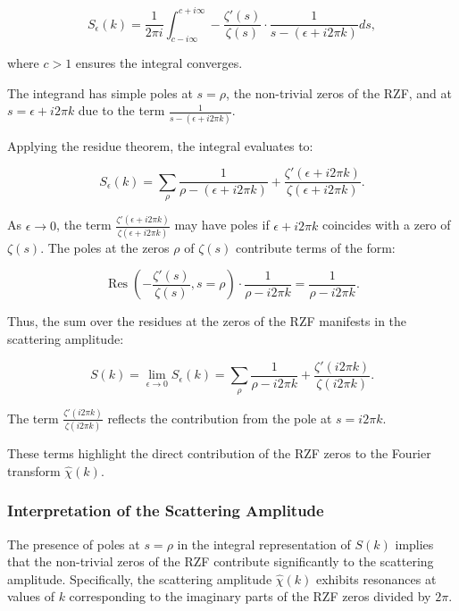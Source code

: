 \documentclass[11pt, oneside]{article}
\begin{document}
\begin{equation}
S_\epsilon(k) = \frac{1}{2\pi i} \int_{c - i \infty}^{c + i \infty} -\frac{\zeta'(s)}{\zeta(s)} \cdot \frac{1}{s - (\epsilon + i 2\pi k)} ds,
\end{equation}

where $c > 1$ ensures the integral converges.

The integrand has simple poles at $s = \rho$, the non-trivial zeros of the RZF, and at $s = \epsilon + i 2\pi k$ due to the term $\frac{1}{s - (\epsilon + i 2\pi k)}$.

Applying the residue theorem, the integral evaluates to:

\begin{equation}
S_\epsilon(k) = \sum_{\rho} \frac{1}{\rho - (\epsilon + i 2\pi k)} + \frac{\zeta'(\epsilon + i 2\pi k)}{\zeta(\epsilon + i 2\pi k)}.
\end{equation}

As $\epsilon \to 0$, the term $\frac{\zeta'(\epsilon + i 2\pi k)}{\zeta(\epsilon + i 2\pi k)}$ may have poles if $\epsilon + i 2\pi k$ coincides with a zero of $\zeta(s)$. The poles at the zeros $\rho$ of $\zeta(s)$ contribute terms of the form:

\begin{equation}
\operatorname{Res}\left(-\frac{\zeta'(s)}{\zeta(s)}, s = \rho\right) \cdot \frac{1}{\rho - i 2\pi k} = \frac{1}{\rho - i 2\pi k}.
\end{equation}

Thus, the sum over the residues at the zeros of the RZF manifests in the scattering amplitude:

\begin{equation}
S(k) = \lim_{\epsilon \to 0} S_\epsilon(k) = \sum_{\rho} \frac{1}{\rho - i 2\pi k} + \frac{\zeta'(i 2\pi k)}{\zeta(i 2\pi k)}.
\end{equation}

The term $\frac{\zeta'(i 2\pi k)}{\zeta(i 2\pi k)}$ reflects the contribution from the pole at $s = i 2\pi k$.

These terms highlight the direct contribution of the RZF zeros to the Fourier transform $\hat{\chi}(k)$.

\subsubsection{Interpretation of the Scattering Amplitude}

The presence of poles at $s = \rho$ in the integral representation of $S(k)$ implies that the non-trivial zeros of the RZF contribute significantly to the scattering amplitude. Specifically, the scattering amplitude $\hat{\chi}(k)$ exhibits resonances at values of $k$ corresponding to the imaginary parts of the RZF zeros divided by $2\pi$.
\end{document}
